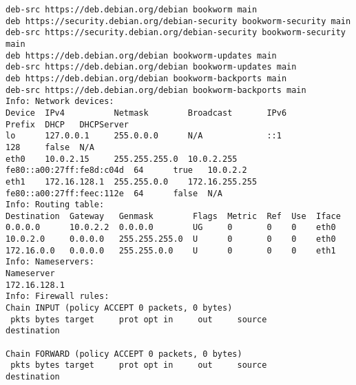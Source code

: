\begin{longlisting}
\begin{verbatim}
deb-src https://deb.debian.org/debian bookworm main
deb https://security.debian.org/debian-security bookworm-security main
deb-src https://security.debian.org/debian-security bookworm-security main
deb https://deb.debian.org/debian bookworm-updates main
deb-src https://deb.debian.org/debian bookworm-updates main
deb https://deb.debian.org/debian bookworm-backports main
deb-src https://deb.debian.org/debian bookworm-backports main
Info: Network devices:
Device  IPv4          Netmask        Broadcast       IPv6                      Prefix  DHCP   DHCPServer
lo      127.0.0.1     255.0.0.0      N/A             ::1                       128     false  N/A
eth0    10.0.2.15     255.255.255.0  10.0.2.255      fe80::a00:27ff:fe8d:c04d  64      true   10.0.2.2
eth1    172.16.128.1  255.255.0.0    172.16.255.255  fe80::a00:27ff:feec:112e  64      false  N/A
Info: Routing table:
Destination  Gateway   Genmask        Flags  Metric  Ref  Use  Iface
0.0.0.0      10.0.2.2  0.0.0.0        UG     0       0    0    eth0
10.0.2.0     0.0.0.0   255.255.255.0  U      0       0    0    eth0
172.16.0.0   0.0.0.0   255.255.0.0    U      0       0    0    eth1
Info: Nameservers:
Nameserver
172.16.128.1
Info: Firewall rules:
Chain INPUT (policy ACCEPT 0 packets, 0 bytes)
 pkts bytes target     prot opt in     out     source               destination

Chain FORWARD (policy ACCEPT 0 packets, 0 bytes)
 pkts bytes target     prot opt in     out     source               destination


\end{verbatim}
\end{longlisting}

